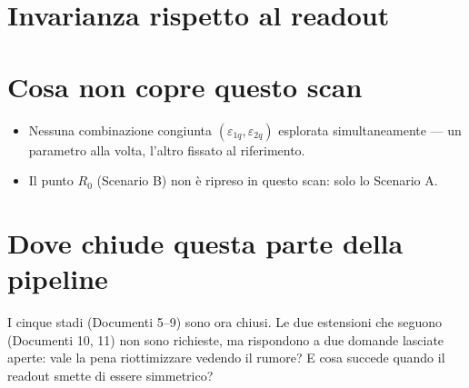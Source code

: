 \documentclass[11pt,a4paper]{article}
\begin{document}
\section{Invarianza rispetto al readout}



\section{Cosa non copre questo scan}

\begin{itemize}[leftmargin=1.5em,itemsep=2pt]
\item Nessuna combinazione congiunta $(\varepsilon_{1q},\varepsilon_{2q})$
esplorata simultaneamente --- un parametro alla volta, l'altro fissato al
riferimento.
\item Il punto $R_0$ (Scenario B) non è ripreso in questo scan: solo lo
Scenario A.
\end{itemize}

\section{Dove chiude questa parte della pipeline}

I cinque stadi (Documenti 5--9) sono ora chiusi. Le due estensioni che
seguono (Documenti 10, 11) non sono richieste, ma rispondono a due domande
lasciate aperte: vale la pena riottimizzare vedendo il rumore? E cosa
succede quando il readout smette di essere simmetrico?
\end{document}
